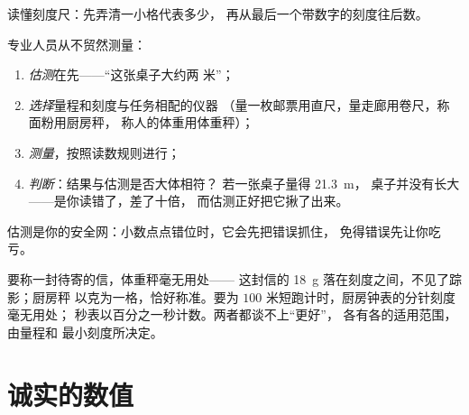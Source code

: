 \begin{omfigure}

{\small 读懂刻度尺：先弄清一小格代表多少，
再从最后一个带数字的刻度往后数。}
\end{omfigure}

\begin{method}[估测、测量、判断]\label{met:g6:measurement-in-science:estimate}
专业人员从不贸然测量：
\begin{enumerate}
  \item \emph{估测}在先——“这张桌子大约两
        米”；
  \item \emph{选择}量程和刻度与任务相配的仪器
        （量一枚邮票用直尺，量走廊用卷尺，称面粉用厨房秤，
        称人的体重用体重秤）；
  \item \emph{测量}，按照读数规则进行；
  \item \emph{判断}：结果与估测是否大体相符？
        若一张桌子量得 \qty{21.3}{m}，
        桌子并没有长大——是你读错了，差了十倍，
        而估测正好把它揪了出来。
\end{enumerate}
估测是你的安全网：小数点点错位时，它会先把错误抓住，
免得错误先让你吃亏。
\end{method}

\begin{example}[慎重选择]\label{ex:g6:measurement-in-science:choose}
要称一封待寄的信，体重秤毫无用处——
这封信的 \qty{18}{g} 落在刻度之间，不见了踪影；厨房秤
以克为一格，恰好称准。要为
$100$ 米短跑计时，厨房钟表的分针刻度毫无用处；
秒表以百分之一秒计数。两者都谈不上“更好”，
各有各的适用范围，由量程和
最小刻度所决定。
\end{example}

\section{诚实的数值}

